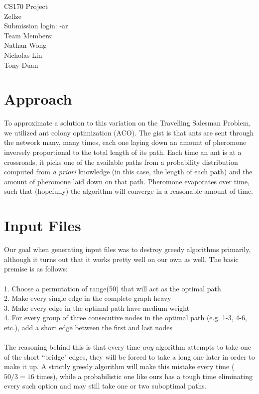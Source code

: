 \documentclass{article}
\newcommand{\tab}[0]{\hspace*{0.5in}}
\begin{document}
\begin{center}
    CS170 Project\\
    Zellze \\
    Submission login:  -ar \\
    Team Members: \\
    Nathan Wong \\
    Nicholas Lin \\
    Tony Duan
\end{center}

\section*{Approach}
To approximate a solution to this variation on the Travelling Salesman Problem, we utilized ant colony optimization (ACO). The gist is that ants are sent through the network many, many times, each one laying down an amount of pheromone inversely proportional to the total length of its path. Each time an ant is at a crossroads, it picks one of the available paths from a probability distribution computed from \textit{a priori} knowledge (in this case, the length of each path) and the amount of pheromone laid down on that path. Pheromone evaporates over time, such that (hopefully) the algorithm will converge in a reasonable amount of time. \\

\section*{Input Files}
Our goal when generating input files was to destroy greedy algorithms primarily, although it turns out that it works pretty well on our own as well. The basic premise is as follows: \\\\
\tab 1. Choose a permutation of range(50) that will act as the optimal path \\
\tab 2. Make every single edge in the complete graph heavy \\
\tab 3. Make every edge in the optimal path have medium weight \\
\tab 4. For every group of three consecutive nodes in the optimal path (e.g. 1-3, 4-6, etc.), add a short edge between the first and last nodes \\\\
The reasoning behind this is that every time \textit{any} algorithm attempts to take one of the short ``bridge" edges, they will be forced to take a long one later in order to make it up. A strictly greedy algorithm will make this mistake every time ($50/3 = 16$ times), while a probabilistic one like ours has a tough time eliminating every such option and may still take one or two suboptimal paths. \\
\end{document}
